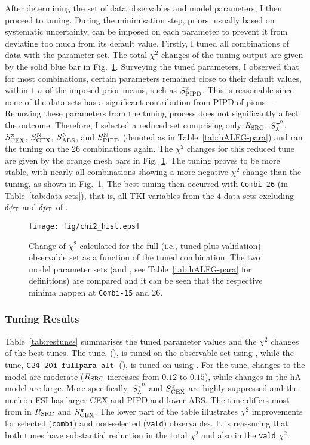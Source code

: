     After determining the set of data observables and model parameters, I then proceed to tuning. During the minimisation step, priors, usually based on systematic uncertainty, can be imposed on each parameter to prevent it from deviating too much from its default value.     
    Firstly, I tuned all combinations of data with the \allpar parameter set. 
    The total $\chi^2$ changes of the tuning output are given by the solid blue bar in Fig.~\ref{fig:allchi}. 
    Surveying the tuned parameters, I observed that for most combinations, certain parameters remained close to their default values, within $1$ $\sigma$ of the imposed prior means, such as $S_\textrm{PIPD}^{\pi}$. 
    This is reasonable since none of the data sets has a significant contribution from PIPD of pions---Removing these parameters from the tuning process does not significantly affect the outcome.
    Therefore, I selected a reduced set comprising only $R_\textrm{SRC}$, $S_\lambda^{\pi^{0}}$, $S_\textrm{CEX}^{\pi}$, $S_\textrm{CEX}^\textrm{N}$, $S_\textrm{ABS}^\textrm{N}$, and $S_\textrm{PIPD}^\textrm{N}$ (denoted as \redpar in Table~\ref{tab:hALFG-para}) and ran the tuning on the 26 combinations again. 
    The $\chi^2$ changes for this reduced tune are given by the orange mesh bars in Fig.~\ref{fig:allchi}. 
    The \redpar tuning proves to be more stable, with nearly all combinations showing a more negative $\chi^2$ change than the \allpar tuning, as shown in Fig.~\ref{fig:allchi}. 
    The best tuning then occurred with \texttt{Combi-26} (\cbRedPar in Table~\ref{tab:data-sets}), that is, all TKI variables from the $4$ data sets excluding $\delta\phi_\textrm{T}$ and $\delta p_\textrm{T}$ of \minzpi. 

    \begin{figure}[!htb] 
    \centering 		
    \texttt{[image: fig/chi2\_hist.eps]} 
    \caption{\label{fig:allchi} Change of $\chi^2$ calculated for the full (i.e., tuned plus validation) observable set as a function of the tuned combination. The two model parameter sets (\allpar and \redpar, see Table~\ref{tab:hALFG-para} for definitions) are compared and it can be seen that the respective minima happen at \texttt{Combi-15} and 26. }   
\end{figure}
    
    \subsubsection{\label{sec:tune-results}Tuning Results} 
    Table~\ref{tab:restunes} summarises the tuned parameter values and the $\chi^2$ changes of the best tunes. 
    The tune, \restunefull (\gC), is tuned on the observable set \cbRedPar using \redpar, while the tune, $\texttt{G24\_20i\_fullpara\_alt}$~(\gT), is tuned on \cbAllPar using \allpar. 
    For the \gC tune, changes to the \sfcfg model are moderate ($R_\textrm{SRC}$ increases from $0.12$ to $0.15$), while changes in the hA model are large. More specifically, $S_\lambda^{\pi^{0}}$ and $S_\textrm{CEX}^{\pi}$ are highly suppressed and the nucleon FSI has larger CEX and PIPD and lower ABS.  
    The tune \gT differs most from \gC in $R_\textrm{SRC}$ and $S_\textrm{CEX}^{\pi}$. 
    The lower part of the table illustrates $\chi^2$ improvements for selected (\texttt{combi}) and non-selected (\texttt{vald}) observables. 
    It is reassuring that both tunes have substantial reduction in the total $\chi^2$ and also in the \texttt{vald}  $\chi^2$.
    
